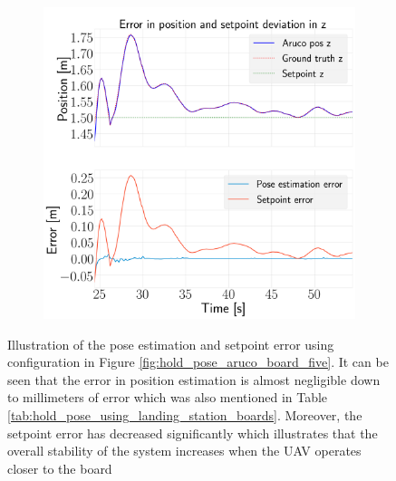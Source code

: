 \documentclass[../Head/report.tex]{subfiles}
\begin{document}
\begin{figure}[H]
\begin{subfigure}[t]{.30\textwidth}
        \caption{}
        \label{fig:hold_pose_estimation_test5_y}
    \end{subfigure}
     \hspace{0.2em}
    \begin{subfigure}[t]{.30\textwidth}
        \centering
        \includegraphics[width=\textwidth]{../Figures/hold_pose_using_aruco_pose_estimation/test5_landingBoard3_noWind/error_z/pose_error_z_test1.png}
        \caption{}
        \label{fig:hold_pose_estimation_test5_z}
    \end{subfigure}
    \caption{Illustration of the pose estimation and setpoint error using configuration in Figure \ref{fig:hold_pose_aruco_board_five}. It can be seen that the error in position estimation is almost negligible down to millimeters of error which was also mentioned in Table \ref{tab:hold_pose_using_landing_station_boards}. Moreover, the setpoint error has decreased significantly which illustrates that the overall stability of the system increases when the UAV operates closer to the board}
    \label{fig:hold_pose_estimation_test5_error_pos}
\end{figure}
\end{document}

